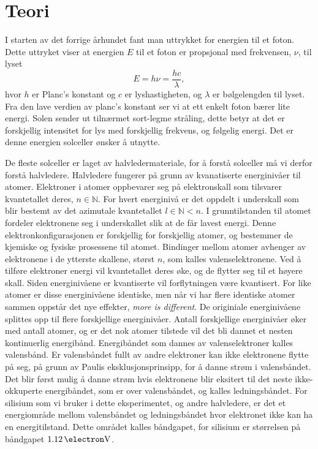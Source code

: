 \documentclass[%
 reprint,
 amsmath,amssymb,
 aps,
 norsk,
 booktabs
]{revtex4-1}
\begin{document}
\section{Teori}
I starten av det forrige århundet fant man uttrykket for energien til et foton. Dette uttryket viser at energien $E$ til et foton er propsjonal med frekvensen, $\nu$, til lyset
\begin{equation}
  E = h\nu = \frac{hc}{\lambda} \label{einstein},
\end{equation}hvor $h$ er Planc's konstant og $c$ er lyshastigheten, og $\lambda$ er bølgelengden til lyset. Fra den lave verdien av planc's konstant ser vi at ett enkelt foton bærer lite energi.  Solen sender ut tilnærmet sort-legme stråling, dette betyr at det er forskjellig intensitet for lys med forskjellig frekvens, og følgelig energi.
Det er denne energien solceller ønsker å utnytte.\par
De fleste solceller er laget av halvledermateriale, for å forstå solceller må vi derfor forstå halvledere. Halvledere fungerer på grunn av kvanatiserte energinivåer til atomer. Elektroner i atomer oppbevarer seg på elektronskall som tilsvarer kvantetallet deres, $n\in\mathbb{N}$. For hvert energinivå er det oppdelt i underskall som blir bestemt av det azimutale kvantetallet $l \in \mathbb{N} < n$. I grunntilstanden til atomet fordeler elektronene seg i underskallet slik at de får lavest energi. Denne elektronkonfigurasjonen er forskjellig for forskjellig atomer, og bestemmer de kjemiske og fysiske prosessene til atomet. Bindinger mellom atomer avhenger av elektronene i de ytterste skallene, størst $n$, som kalles valenselektronene. Ved å tilføre elektroner energi vil kvantetallet deres øke, og de flytter seg til et høyere skall. Siden energinivåene er kvantiserte vil forflytningen være kvantisert. For like atomer er disse energinivåene identiske, men når vi har flere identiske atomer sammen oppstår det nye effekter, \textit{more is different}. De originiale energinivåene splittes opp til flere forskjellige energinivåer. Antall forskjellige energinivåer øker med antall atomer, og er det nok atomer tilstede vil det bli dannet et nesten kontinuerlig energibånd. Energibåndet som dannes av valenselektroner kalles valensbånd. Er valensbåndet fullt av andre elektroner kan ikke elektronene flytte på seg, på grunn av Paulis eksklusjonsprinsipp, for å danne strøm i valensbåndet. Det blir først mulig å danne strøm hvis elektronene blir eksitert til det neste ikke-okkuperte energibåndet, som er over valensbåndet, og kalles ledningsbåndet. For silisium som vi bruker i dette eksperimentet, og andre halvledere, er det et energiområde mellom valensbåndet og ledningsbåndet hvor elektronet ikke kan ha en energitilstand. Dette området kalles båndgapet, for silisium er størrelsen på båndgapet $\SI{1.12}{\electron\volt}$.\par
\end{document}
